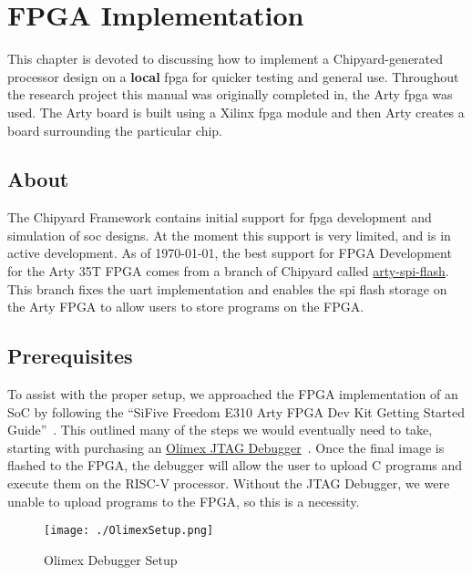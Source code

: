 \chapter{FPGA Implementation}\label{chap:FPGA_Implementation}
This chapter is devoted to discussing how to implement a Chipyard-generated processor design on a \textbf{local} \gls{fpga} for quicker testing and general use.
Throughout the research project this manual was originally completed in, the Arty \gls{fpga} was used.
The Arty board is built using a Xilinx \gls{fpga} module and then Arty creates a board surrounding the particular chip.

\section{About}\label{sec:About}
The Chipyard Framework contains initial support for \gls{fpga} development and simulation of \gls{soc} designs.
At the moment this support is very limited, and is in active development.
As of \today, the best support for FPGA Development for the Arty 35T FPGA comes from a branch of Chipyard called \href{https://github.com/ucb-bar/chipyard/tree/arty-spi-flash}{arty-spi-flash}.
This branch fixes the \gls{uart} implementation and enables the \gls{spi} flash storage on the Arty FPGA to allow users to store programs on the FPGA.\@

\section{Prerequisites}\label{sec:Prerequisites}
To assist with the proper setup, we approached the FPGA implementation of an SoC by following the ``SiFive Freedom E310 Arty FPGA Dev Kit Getting Started Guide''~\cite{FreedomDevGuide}.
This outlined many of the steps we would eventually need to take, starting with purchasing an \href{https://www.digikey.com/en/products/detail/olimex-ltd/ARM-USB-TINY-H/3471388}{Olimex JTAG Debugger}~\cite{OlimexJTAG}.
Once the final image is flashed to the FPGA, the debugger will allow the user to upload C programs and execute them on the RISC-V processor. Without the JTAG Debugger, we were unable to upload programs to the FPGA, so this is a necessity.

\begin{figure}[h!tbp]
  \centering
  \texttt{[image: ./OlimexSetup.png]}
  \caption{Olimex Debugger Setup~\cite[p.~5]{FreedomDevGuide}}
  \label{fig:olimexsetup}
\end{figure}

